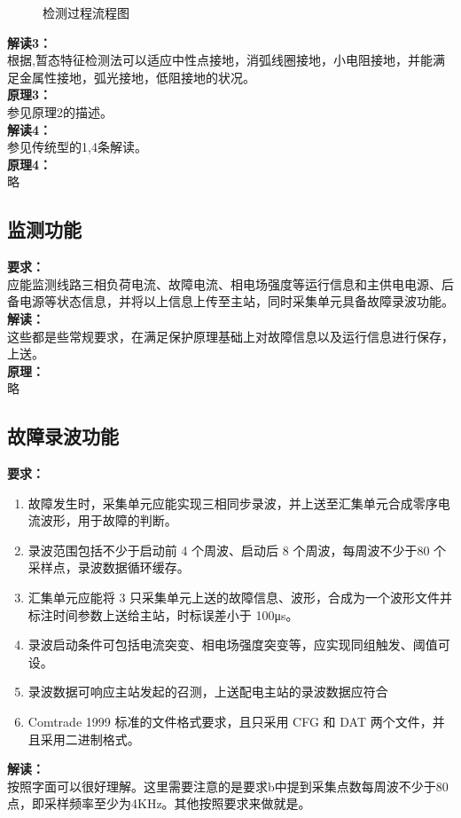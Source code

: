\documentclass{article}
\begin{document}
\begin{CJK}{UTF8}{gbsn}
\begin{figure}[H]
		\caption{检测过程流程图}
		\end{figure}
		\textbf{解读3：}\\
		根据\cite{p1},暂态特征检测法可以适应中性点接地，消弧线圈接地，小电阻接地，并能满足金属性接地，弧光接地，低阻接地的状况。\\
		\textbf{原理3：}\\
		参见原理2的描述。\\
		\textbf{解读4：}\\
		参见传统型的1,4条解读。\\
		\textbf{原理4：}\\
		略
\subsection{ 监测功能}
		\par
		\textbf{要求：}\\
		应能监测线路三相负荷电流、故障电流、相电场强度等运行信息和主供电电源、后备电源等状态信息，并将以上信息上传至主站，同时采集单元具备故障录波功能。\\		\textbf{解读：}\\
		这些都是些常规要求，在满足保护原理基础上对故障信息以及运行信息进行保存，上送。\\
		\textbf{原理：}\\
		略
\subsection{ 故障录波功能}
		\par
		\textbf{要求：}
			\begin{enumerate}
				\item 故障发生时，采集单元应能实现三相同步录波，并上送至汇集单元合成零序电流波形，用于故障的判断。 
				\item 录波范围包括不少于启动前 4 个周波、启动后 8 个周波，每周波不少于80 个采样点，录波数据循环缓存。 
				\item 汇集单元应能将 3 只采集单元上送的故障信息、波形，合成为一个波形文件并标注时间参数上送给主站，时标误差小于 100μs。 
				\item 录波启动条件可包括电流突变、相电场强度突变等，应实现同组触发、阈值可设。 
				\item 录波数据可响应主站发起的召测，上送配电主站的录波数据应符合
				\item Comtrade 1999 标准的文件格式要求，且只采用 CFG 和 DAT 两个文件，并且采用二进制格式。 
		\end{enumerate}
		\textbf{解读：}\\
		按照字面可以很好理解。这里需要注意的是要求b中提到采集点数每周波不少于80点，即采样频率至少为4KHz。其他按照要求来做就是。

\end{CJK}
\end{document}
